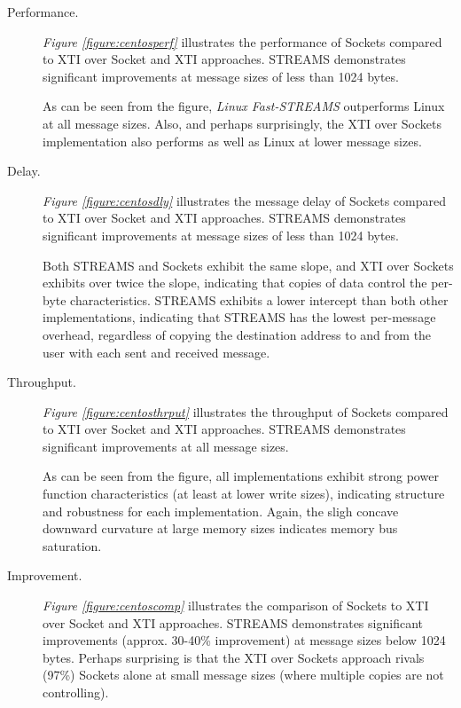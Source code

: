 \documentclass[letterpaper,final,notitlepage,twocolumn,10pt,twoside]{article}
\begin{document}
\begin{description}

\item[Performance.]

\textit{Figure \ref{figure:centosperf}}
illustrates the performance of Sockets compared
to XTI over Socket and XTI approaches.  STREAMS demonstrates significant
improvements at message sizes of less than 1024 bytes.

As can be seen from the figure, \textsl{Linux Fast-STREAMS} outperforms Linux
at all message sizes.  Also, and perhaps surprisingly, the XTI over Sockets
implementation also performs as well as Linux at lower message sizes.

\item[Delay.]

\textit{Figure \ref{figure:centosdly}}
illustrates the message delay of Sockets compared
to XTI over Socket and XTI approaches.  STREAMS demonstrates significant
improvements at message sizes of less than 1024 bytes.

Both STREAMS and Sockets exhibit the same slope, and XTI over Sockets exhibits
over twice the slope, indicating that copies of data control the per-byte
characteristics.  STREAMS exhibits a lower intercept than both other
implementations, indicating that STREAMS has the lowest per-message overhead,
regardless of copying the destination address to and from the user with each
sent and received message.

\item[Throughput.]

\textit{Figure \ref{figure:centosthrput}}
illustrates the throughput of Sockets compared
to XTI over Socket and XTI approaches.  STREAMS demonstrates significant
improvements at all message sizes.

As can be seen from the figure, all implementations exhibit strong power
function characteristics (at least at lower write sizes), indicating structure
and robustness for each implementation.  Again, the sligh concave downward
curvature at large memory sizes indicates memory bus saturation.

\item[Improvement.]

\textit{Figure \ref{figure:centoscomp}}
illustrates the comparison of Sockets to XTI
over Socket and XTI approaches.  STREAMS demonstrates significant improvements
(approx. 30-40\% improvement) at message sizes below 1024 bytes.
Perhaps surprising is that the XTI over Sockets approach rivals (97\%) Sockets
alone at small message sizes (where multiple copies are not controlling).

\end{description}
\end{document}

